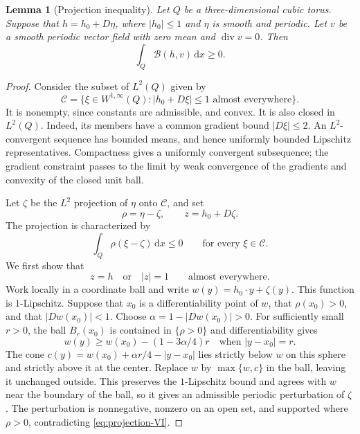 \documentclass[11pt,a4paper,reqno]{amsart}
\theoremstyle{plain}
\newtheorem{lemma}[theorem]{Lemma}
\theoremstyle{remark}
\numberwithin{equation}{section}
\newcommand{\dd}{\,\mathrm d}
\begin{document}
\begin{lemma}[Projection inequality]\label{lem:projection}
Let $Q$ be a three-dimensional cubic torus. Suppose that $h=h_0+D\eta$, where $|h_0|\le1$ and $\eta$ is smooth and periodic. Let $v$ be a smooth periodic vector field with zero mean and $\operatorname{div}v=0$. Then
\begin{equation}\label{eq:projection-conclusion}
 \int_Q\mathcal B(h,v)\dd x\ge0.
\end{equation}
\end{lemma}
\begin{proof}
Consider the subset of $L^2(Q)$ given by
\[
 \mathscr C=\{\xi\in W^{1,\infty}(Q):|h_0+D\xi|\le1
                         \text{ almost everywhere}\}.
\]
It is nonempty, since constants are admissible, and convex. It is also closed in $L^2(Q)$. Indeed, its members have a common gradient bound $|D\xi|\le2$. An $L^2$-convergent sequence has bounded means, and hence uniformly bounded Lipschitz representatives. Compactness gives a uniformly convergent subsequence; the gradient constraint passes to the limit by weak convergence of the gradients and convexity of the closed unit ball.

Let $\zeta$ be the $L^2$ projection of $\eta$ onto $\mathscr C$, and set
\[
 \rho=\eta-\zeta,\qquad z=h_0+D\zeta.
\]
The projection is characterized by
\begin{equation}\label{eq:projection-VI}
 \int_Q\rho(\xi-\zeta)\dd x\le0
 \qquad\text{for every }\xi\in\mathscr C.
\end{equation}
We first show that
\begin{equation}\label{eq:projection-saturation}
 z=h\quad\text{or}\quad |z|=1
 \qquad\text{almost everywhere}.
\end{equation}
Work locally in a coordinate ball and write $w(y)=h_0\cdot y+\zeta(y)$. This function is $1$-Lipschitz. Suppose that $x_0$ is a differentiability point of $w$, that $\rho(x_0)>0$, and that $|Dw(x_0)|<1$. Choose $\alpha=1-|Dw(x_0)|>0$. For sufficiently small $r>0$, the ball $B_r(x_0)$ is contained in $\{\rho>0\}$ and differentiability gives
\[
 w(y)\ge w(x_0)-(1-3\alpha/4)r
 \quad\text{when }|y-x_0|=r.
\]
The cone $c(y)=w(x_0)+\alpha r/4-|y-x_0|$ lies strictly below $w$ on this sphere and strictly above it at the center. Replace $w$ by $\max\{w,c\}$ in the ball, leaving it unchanged outside. This preserves the $1$-Lipschitz bound and agrees with $w$ near the boundary of the ball, so it gives an admissible periodic perturbation of $\zeta$. The perturbation is nonnegative, nonzero on an open set, and supported where $\rho>0$, contradicting \eqref{eq:projection-VI}.


\end{proof}
\end{document}
